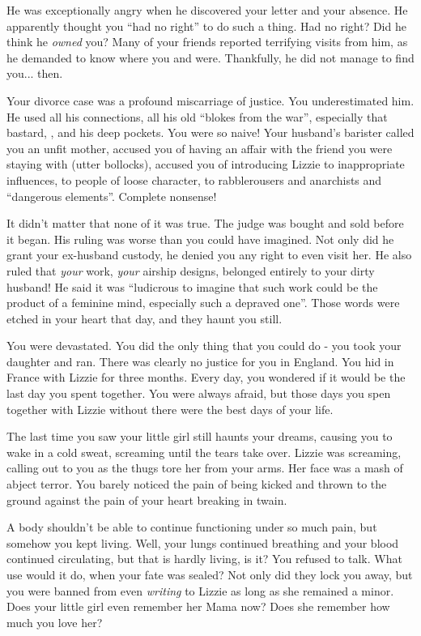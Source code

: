 \documentclass[char]{airship}
\begin{document}
He was exceptionally angry when he discovered your letter and your
absence. He apparently thought you ``had no right'' to do such a
thing. Had no right? Did he think he {\em owned} you? Many of your
friends reported terrifying visits from him, as he demanded to know
where you and \cThief{} were. Thankfully, he did not manage to find
you... then. 

Your divorce case was a profound miscarriage of justice. You
underestimated him. He used all his connections, all his old ``blokes
from the war'', especially that bastard, \cBoddy{}, and his deep
pockets. You were so naive! Your husband's barister called you an
unfit mother, accused you of having an affair with the friend you
were staying with (utter bollocks), accused you of introducing Lizzie
to inappropriate influences, to people of loose character, to
rabblerousers and anarchists and ``dangerous elements''. Complete
nonsense!

It didn't matter that none of it was true. The judge was bought and
sold before it began. His ruling was worse than you could have
imagined. Not only did he grant your ex-husband custody, he denied
you any right to even visit her. He also ruled that {\em your} work,
{\em your} airship designs, belonged entirely to your dirty husband!
He said it was ``ludicrous to imagine that such work could be the
product of a feminine mind, especially such a depraved one''. Those
words were etched in your heart that day, and they haunt you still.

You were devastated. You did the only thing that you could do - you
took your daughter and ran. There was clearly no justice for you in
England. You hid in France with Lizzie for three months. Every day,
you wondered if it would be the last day you spent together. You were
always afraid, but those days you spen together with Lizzie without
\cCaptain{} there were the best days of your life.

The last time you saw your little girl still haunts your dreams,
causing you to wake in a cold sweat, screaming until the tears take
over. Lizzie was screaming, calling out to you as the thugs tore her
from your arms. Her face was a mash of abject terror. You barely
noticed the pain of being kicked and thrown to the ground against the
pain of your heart breaking in twain.

A body shouldn't be able to continue functioning under so much pain,
but somehow you kept living. Well, your lungs continued breathing and
your blood continued circulating, but that is hardly living, is it?
You refused to talk. What use would it do, when your fate was sealed?
Not only did they lock you away, but you were banned from even {\em
writing} to Lizzie as long as she remained a minor. Does your little
girl even remember her Mama now? Does she remember how much you love
her?
\end{document}

